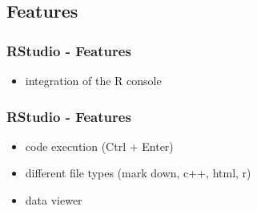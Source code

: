 \documentclass[xcolor={table},c]{beamer}
\begin{document}
\subsection{Features}
\begin{frame}\frametitle{RStudio - Features}
  \begin{itemize}
  \item integration of the R console
  \end{itemize}
\begin{center}
\end{center}
\end{frame}

\begin{frame}\frametitle{RStudio - Features}
  \begin{itemize}
    \item code execution (Ctrl + Enter)
    \item different file types (mark down, c++, html, r)
    \item data viewer
  \end{itemize}
\begin{center}
\end{center}
\end{frame}
\end{document}
